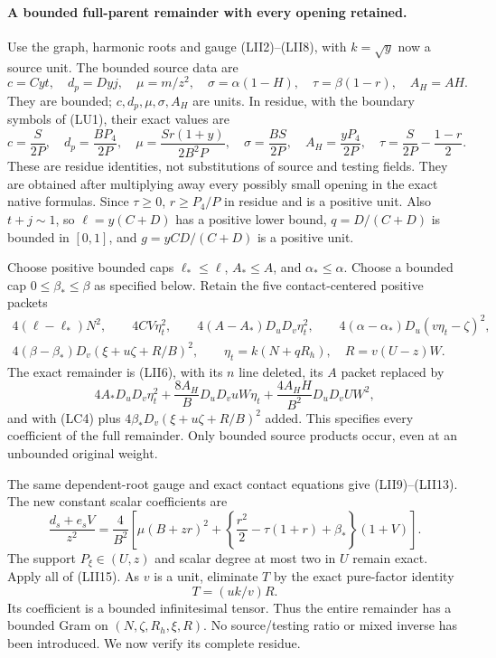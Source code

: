 \paragraph{A bounded full-parent remainder with every opening retained.}
Use the graph, harmonic roots and gauge (LII2)--(LII8), with
$k=\sqrt y$ now a source unit.  The bounded source data are
\[
 c=Cyt,\quad d_p=Dyj,\quad
 \mu=m/z^2,\quad \sigma=\alpha(1-H),\quad
 \tau=\beta(1-r),\quad A_H=AH.
\]
They are bounded; $c,d_p,\mu,\sigma,A_H$ are units.  In residue,
with the boundary symbols of (LU1), their exact values are
\[
 c=\frac S{2P},\quad d_p=\frac{BP_4}{2P},\quad
 \mu=\frac{Sr(1+y)}{2B^2P},\quad
 \sigma=\frac{BS}{2P},\quad A_H=\frac{yP_4}{2P},\quad
 \tau=\frac S{2P}-\frac{1-r}{2}.                         \tag{LU3}
\]
These are residue identities, not substitutions of source and
testing fields.  They are obtained after multiplying away every
possibly small opening in the exact native formulas.
Since $\tau\ge0$, $r\ge P_4/P$ in residue and is a positive unit.
Also $t+j\sim1$, so $\ell=y(C+D)$ has a positive lower bound,
$q=D/(C+D)$ is bounded in $[0,1]$, and
$g=yCD/(C+D)$ is a positive unit.

Choose positive bounded caps $\ell_*\le\ell$,
$A_*\le A$, and $\alpha_*\le\alpha$.  Choose a bounded cap
$0\le\beta_*\le\beta$ as specified below.  Retain the five
contact-centered positive packets
\[
\begin{gathered}
 4(\ell-\ell_*)N^2,\qquad 4CV\eta_t^2,\qquad
 4(A-A_*)D_uD_v\eta_t^2,\qquad
 4(\alpha-\alpha_*)D_u(v\eta_t-\zeta)^2,\\
 4(\beta-\beta_*)D_v(\xi+u\zeta+R/B)^2,
 \qquad \eta_t=k(N+qR_h),\quad R=v(U-z)W.
\end{gathered}
\tag{LU4}
\]
The exact remainder is (LII6), with its $n$ line deleted, its $A$
packet replaced by
\[
 4A_*D_uD_v\eta_t^2
 +\frac{8A_H}B D_uD_vuW\eta_t
 +\frac{4A_HH}{B^2}D_uD_vUW^2,
                                                               \tag{LU5}
\]
and with (LC4) plus $4\beta_*D_v(\xi+u\zeta+R/B)^2$ added.
This specifies every coefficient of the full remainder.  Only
bounded source products occur, even at an unbounded original weight.

The same dependent-root gauge and exact contact equations give
(LII9)--(LII13).  The new constant scalar coefficients are
\[
 \frac{d_s+e_sV}{z^2}=
 \frac4{B^2}\left[
 \mu(B+zr)^2+
 \left\{\frac{r^2}{2}-\tau(1+r)+\beta_*\right\}(1+V)
 \right].                                                   \tag{LU6}
\]
The support $P_\xi\in(U,z)$ and scalar degree at most two in $U$
remain exact.  Apply all of (LII15).  As $v$ is a unit, eliminate
$T$ by the exact pure-factor identity
\[
                        T=(uk/v)R.                         \tag{LU7}
\]
Its coefficient is a bounded infinitesimal tensor.  Thus the entire
remainder has a bounded Gram on
$(N,\zeta,R_h,\xi,R)$.  No source/testing ratio or mixed inverse
has been introduced.  We now verify its complete residue.

